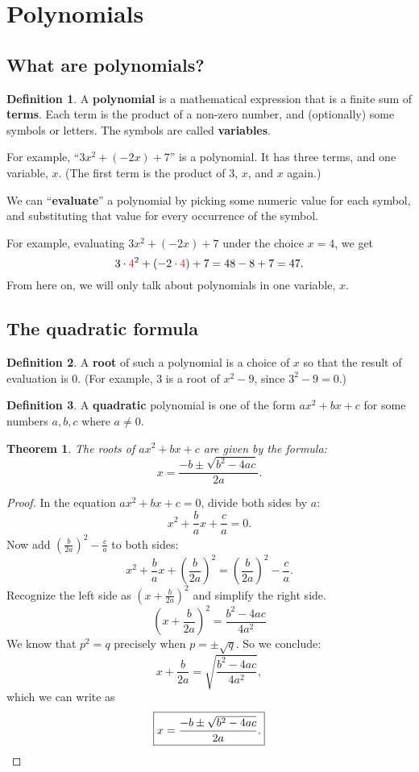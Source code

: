 \documentclass[12pt,a4paper]{article}
\theoremstyle{plain}\newtheorem*{mythm}{Theorem}
\theoremstyle{definition}\newtheorem*{mydef}{Definition}
\newcommand{\red}[1]{{\color{red}#1}}
\begin{document}
\section{Polynomials}
\subsection{What are polynomials?}
\begin{mydef}
	A \textbf{polynomial} is a mathematical expression that is a finite sum of \textbf{terms}. Each term is the product of a non-zero number, and (optionally) some symbols or letters. The symbols are called \textbf{variables}.
\end{mydef}

For example, ``$3x^2 + (-2x) + 7$'' is a polynomial. It has three terms, and one variable, $x$. (The first term is the product of $3$, $x$, and $x$ again.)

We can ``\textbf{evaluate}'' a polynomial by picking some numeric value for each symbol, and substituting that value for every occurrence of the symbol.

For example, evaluating $3x^2 + (-2x) + 7$ under the choice $x=4$, we get \[
	3 \cdot \red{4}^2 + (-2 \cdot \red{4}) + 7 = 48 - 8 + 7 = 47.
\]
From here on, we will only talk about polynomials in one variable, $x$.

\subsection{The quadratic formula}
\begin{mydef}
	A \textbf{root} of such a polynomial is a choice of $x$ so that the result of evaluation is $0$. (For example, 3 is a root of $x^2 - 9$, since $3^2 - 9 = 0$.)
\end{mydef}

\begin{mydef}
	A \textbf{quadratic} polynomial is one of the form $ax^2 + bx + c$ for some numbers $a, b, c$ where $a \neq 0$.
\end{mydef}

\begin{mythm}
	The roots of $a x^2 + b x + c$ are given by the formula: \[
		\boxed{x = \frac{-b \pm \sqrt{b^2-4ac}}{2a}.}
	\]
\end{mythm}

\begin{proof}
	In the equation $a x^2 + b x + c = 0$, divide both sides by $a$: \[
		x^2 + \frac{b}{a} x + \frac{c}{a} = 0.
	\]
	Now add $\left( \frac{b}{2a} \right)^2 - \frac{c}{a}$ to both sides: \[
		x^2 + \frac{b}{a} x + \left( \frac{b}{2a} \right)^2 = \left( \frac{b}{2a} \right)^2 - \frac{c}{a}.
	\]
	Recognize the left side as $(x + \frac{b}{2a})^2$ and simplify the right side. \[
		\left(x + \frac{b}{2a}\right)^2 = \frac{b^2 - 4ac}{4a^2}
	\]
	We know that $p^2 = q$ precisely when $p = \pm \sqrt{q}$. So we conclude: \[
		x + \frac{b}{2a} = \sqrt{\frac{b^2 - 4ac}{4a^2}},
	\]
	which we can write as \[
		\boxed{x = \frac{-b \pm \sqrt{b^2 - 4ac}}{2a}.} \qedhere
	\]
\end{proof}
\end{document}
